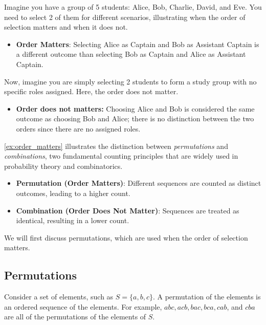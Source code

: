 \begin{example}
    Imagine you have a group of 5 students: Alice, Bob, Charlie, David, and Eve. You need to select 2 of them for different scenarios, illustrating when the order of selection matters and when it does not.
    \begin{itemize}
        \item \textbf{Order Matters}: Selecting Alice as Captain and Bob as Assistant Captain is a different outcome than selecting Bob as Captain and Alice as Assistant Captain.
        \end{itemize}
    Now, imagine you are simply selecting 2 students to form a study group with no specific roles assigned. Here, the order does not matter.
    \begin{itemize}
        \item \textbf{Order does not matters:}  Choosing Alice and Bob is considered the same outcome as choosing Bob and Alice; there is no distinction between the two orders since there are no assigned roles.
    \end{itemize}
    \label{ex:order_matters}
\end{example}

\autoref{ex:order_matters} illustrates the distinction between \textit{permutations} and \textit{combinations}, two fundamental counting principles that are widely used in probability theory and combinatorics.

\begin{definition}
    \begin{itemize}
        \item \textbf{Permutation (Order Matters)}: Different sequences are counted as distinct outcomes, leading to a higher count.
        \item \textbf{Combination (Order Does Not Matter)}: Sequences are treated as identical, resulting in a lower count.
    \end{itemize}
\end{definition}

We will first discuss permutations, which are used when the order of selection matters.

\subsection*{Permutations}

Consider a set of elements, such as $S=\{a, b, c\}$. A permutation of the elements is an ordered sequence of the elements. For example, $a b c, a c b, b a c, b c a, c a b$, and $c b a$ are all of the permutations of the elements of $S$.

